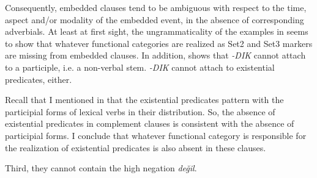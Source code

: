 \documentclass[output=paper]{langsci/langscibook}
\begin{document}
\ea%
    \label{kelepirex:key:12}
    \z
\z
Consequently, embedded clauses tend to be ambiguous with respect to
the time, aspect and/or modality of the embedded event, in the
absence of corresponding adverbials. At least at first sight, the
ungrammaticality of the examples in  seems to show that
whatever functional categories are realized as Set2 and Set3 markers
are missing from embedded clauses. In addition,  shows that 
\textit{-DIK} cannot attach to a participle, i.e. a non-verbal stem.
\textit{-DIK} cannot attach to existential predicates, either. 

\z

Recall that I mentioned in  that the existential predicates pattern with the participial forms 
of lexical verbs in their distribution. 
So, the absence of existential predicates in complement clauses is consistent with the absence of participial forms. 
I conclude that whatever functional category is responsible for the realization of existential predicates is also absent in these clauses.

Third, they cannot contain the high negation \textit{değil}.

\z
\end{document}
